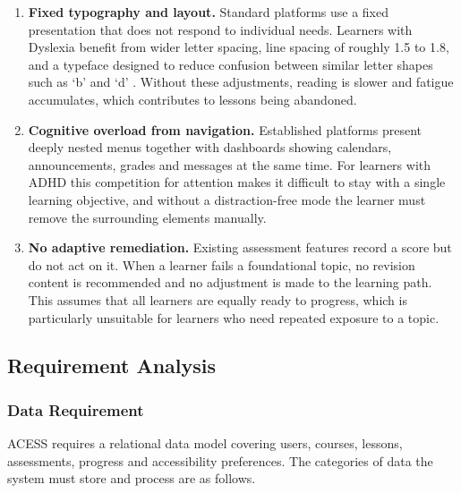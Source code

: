 \documentclass[12pt, oneside]{article} %
\begin{document}
\begin{enumerate}
    \item \textbf{Fixed typography and layout.} Standard platforms use a fixed presentation that does not respond to individual needs. Learners with Dyslexia benefit from wider letter spacing, line spacing of roughly 1.5 to 1.8, and a typeface designed to reduce confusion between similar letter shapes such as `b' and `d' \cite{atkinson2021atkinson,batanero2014accessibility}. Without these adjustments, reading is slower and fatigue accumulates, which contributes to lessons being abandoned.
    \item \textbf{Cognitive overload from navigation.} Established platforms present deeply nested menus together with dashboards showing calendars, announcements, grades and messages at the same time. For learners with ADHD \cite{barkley1997adhd} this competition for attention makes it difficult to stay with a single learning objective, and without a distraction-free mode the learner must remove the surrounding elements manually.
    \item \textbf{No adaptive remediation.} Existing assessment features record a score but do not act on it. When a learner fails a foundational topic, no revision content is recommended and no adjustment is made to the learning path. This assumes that all learners are equally ready to progress, which is particularly unsuitable for learners who need repeated exposure to a topic.
\end{enumerate}

\subsection{Requirement Analysis}

\subsubsection{Data Requirement}

ACESS requires a relational data model covering users, courses, lessons, assessments, progress and accessibility preferences. The categories of data the system must store and process are as follows.
\end{document}

